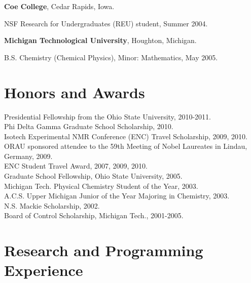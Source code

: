 \documentclass[margin,line]{res}
\newenvironment{list1}{
  \begin{list}{\ding{113}}{%
      \setlength{\itemsep}{0in}
      \setlength{\parsep}{0in} \setlength{\parskip}{0in}
      \setlength{\topsep}{0in} \setlength{\partopsep}{0in} 
      \setlength{\leftmargin}{0.17in}}}{\end{list}}
\begin{document}
\begin{resume}
{\bf Coe College}, Cedar Rapids, Iowa.
\begin{list1}
\item[] NSF Research for Undergraduates (REU) student, Summer 2004.
\end{list1}
\vspace{-0.1in}

{\bf Michigan Technological University}, Houghton, Michigan.
\begin{list1}
\item[] B.S. Chemistry (Chemical Physics), Minor: Mathematics, May 2005.
\end{list1}

\vspace{-0.1in}

\section{\sc Honors and Awards}
Presidential Fellowship from the Ohio State University, 2010-2011.\\
Phi Delta Gamma Graduate School Scholarship, 2010.\\
Isotech Experimental NMR Conference (ENC) Travel Scholarship, 2009, 2010.\\
ORAU sponsored attendee to the 59th Meeting of Nobel Laureates in Lindau, Germany, 2009.\\
ENC Student Travel Award, 2007, 2009, 2010.\\
Graduate School Fellowship, Ohio State University, 2005.\\
Michigan Tech. Physical Chemistry Student of the Year, 2003.\\
A.C.S. Upper Michigan Junior of the Year Majoring in Chemistry, 2003.\\
N.S. Mackie Scholarship, 2002.\\
Board of Control Scholarship, Michigan Tech., 2001-2005.\\

\vspace{-0.2in}
\section{\sc Research and Programming Experience}


\end{resume}
\end{document}
